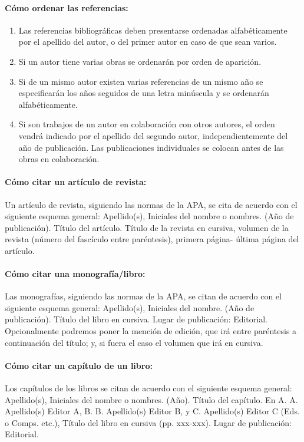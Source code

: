 \paragraph{Cómo ordenar las referencias:}
\begin{enumerate}
\item Las referencias bibliográficas deben presentarse ordenadas alfabéticamente por el apellido del autor, o del primer autor en caso de que sean varios.
\item Si un autor tiene varias obras se ordenarán por orden de aparición.
\item Si de un mismo autor existen varias referencias de un mismo año se especificarán los años seguidos de una letra minúscula y se ordenarán alfabéticamente.
\item Si son trabajos de un autor en colaboración con otros autores, el orden vendrá indicado por el apellido del segundo autor, independientemente del año de publicación. Las publicaciones individuales se colocan antes de las obras en colaboración.
\end{enumerate}

\paragraph{Cómo citar un artículo de revista:}
Un artículo de revista, siguiendo las normas de la APA, se cita de acuerdo con el siguiente esquema general:
Apellido(s), Iniciales del nombre o nombres. (Año de publicación). Título del artículo. Título de la revista en cursiva, volumen de la revista (número del fascículo entre paréntesis), primera página- última página del artículo.

\paragraph{Cómo citar una monografía/libro:}
Las monografías, siguiendo las normas de la APA, se citan de acuerdo con el siguiente esquema general:
Apellido(s), Iniciales del nombre. (Año de publicación). Título del libro en cursiva. Lugar de publicación: Editorial.
Opcionalmente podremos poner la mención de edición, que irá entre paréntesis a continuación del título; y, si fuera el caso el volumen que irá en cursiva.

\paragraph{Cómo citar un capítulo de un libro:}
Los capítulos de los libros se citan de acuerdo con el siguiente esquema general:
Apellido(s), Iniciales del nombre o nombres. (Año). Título del capítulo. En A. A. Apellido(s) Editor A, B. B. Apellido(s) Editor B, y C. Apellido(s) Editor C (Eds. o Comps. etc.), Título del libro en cursiva (pp. xxx-xxx). Lugar de publicación: Editorial.

